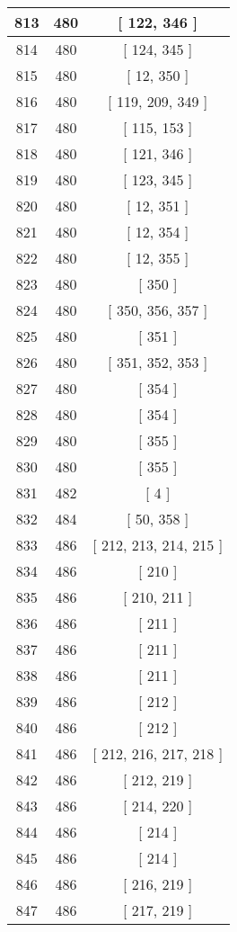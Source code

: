 \begin{center}
\begin{longtable}[H]{|| c c c ||}
\hline
813 & 480 & [ 122, 346 ] \\ 
\hline
814 & 480 & [ 124, 345 ] \\ 
\hline
815 & 480 & [ 12, 350 ] \\ 
\hline
816 & 480 & [ 119, 209, 349 ] \\ 
\hline
817 & 480 & [ 115, 153 ] \\ 
\hline
818 & 480 & [ 121, 346 ] \\ 
\hline
819 & 480 & [ 123, 345 ] \\ 
\hline
820 & 480 & [ 12, 351 ] \\ 
\hline
821 & 480 & [ 12, 354 ] \\ 
\hline
822 & 480 & [ 12, 355 ] \\ 
\hline
823 & 480 & [ 350 ] \\ 
\hline
824 & 480 & [ 350, 356, 357 ] \\ 
\hline
825 & 480 & [ 351 ] \\ 
\hline
826 & 480 & [ 351, 352, 353 ] \\ 
\hline
827 & 480 & [ 354 ] \\ 
\hline
828 & 480 & [ 354 ] \\ 
\hline
829 & 480 & [ 355 ] \\ 
\hline
830 & 480 & [ 355 ] \\ 
\hline
831 & 482 & [ 4 ] \\ 
\hline
832 & 484 & [ 50, 358 ] \\ 
\hline
833 & 486 & [ 212, 213, 214, 215 ] \\ 
\hline
834 & 486 & [ 210 ] \\ 
\hline
835 & 486 & [ 210, 211 ] \\ 
\hline
836 & 486 & [ 211 ] \\ 
\hline
837 & 486 & [ 211 ] \\ 
\hline
838 & 486 & [ 211 ] \\ 
\hline
839 & 486 & [ 212 ] \\ 
\hline
840 & 486 & [ 212 ] \\ 
\hline
841 & 486 & [ 212, 216, 217, 218 ] \\ 
\hline
842 & 486 & [ 212, 219 ] \\ 
\hline
843 & 486 & [ 214, 220 ] \\ 
\hline
844 & 486 & [ 214 ] \\ 
\hline
845 & 486 & [ 214 ] \\ 
\hline
846 & 486 & [ 216, 219 ] \\ 
\hline
847 & 486 & [ 217, 219 ] \\ 

\end{longtable}
\end{center}
